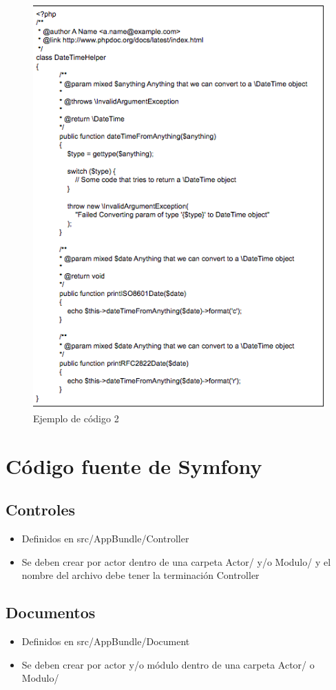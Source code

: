 				\begin{figure}[htbp!]
		\centering
			\includegraphics[width=.8\textwidth]{images/ejemploCodigo2}
		\caption{Ejemplo de código 2}
	\end{figure}
				
\section{Código fuente de Symfony}
\subsection{Controles}
\begin{itemize}
\item Definidos en src/AppBundle/Controller

\item Se deben crear por actor dentro de una carpeta Actor/ y/o Modulo/ y el nombre del archivo debe tener la terminación Controller

\end{itemize}
\subsection{Documentos}
\begin{itemize}
\item Definidos en src/AppBundle/Document

\item Se deben crear por actor y/o módulo dentro de una carpeta Actor/ o  Modulo/

\end{itemize}
